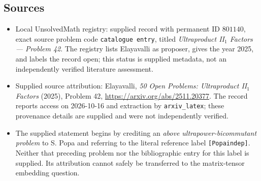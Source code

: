 \documentclass[11pt]{article}
\begin{document}
\subsection{Sources}
\begin{itemize}
\item Local UnsolvedMath registry: supplied record with permanent ID \(801140\), exact source problem code \texttt{catalogue entry}, titled \emph{Ultraproduct II\(_1\) Factors --- Problem 42}. The registry lists Elayavalli as proposer, gives the year 2025, and labels the record open; this status is supplied metadata, not an independently verified literature assessment.
\item Supplied source attribution: Elayavalli, \emph{50 Open Problems: Ultraproduct II\(_1\) Factors} (2025), Problem 42, \url{https://arxiv.org/abs/2511.20377}. The record reports access on 2026-10-16 and extraction by \texttt{arxiv\_latex}; these provenance details are supplied and were not independently verified.
\item The supplied statement begins by crediting an \emph{above ultrapower-bicommutant problem} to S. Popa and referring to the literal reference label \texttt{[Popaindep]}. Neither that preceding problem nor the bibliographic entry for this label is supplied. Its attribution cannot safely be transferred to the matrix-tensor embedding question.
\end{itemize}
\end{document}

